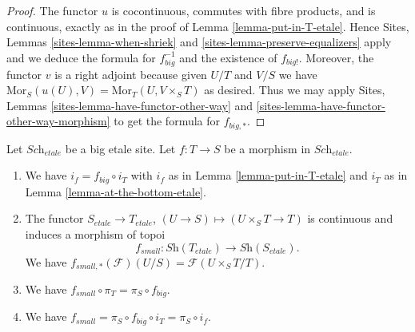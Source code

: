 \begin{proof}
The functor $u$ is cocontinuous, commutes with fibre products,
and is continuous, exactly as in the proof of Lemma \ref{lemma-put-in-T-etale}.
Hence Sites, Lemmas \ref{sites-lemma-when-shriek}
and \ref{sites-lemma-preserve-equalizers}
apply and we deduce the formula
for $f_{big}^{-1}$ and the existence of $f_{big!}$. Moreover,
the functor $v$ is a right adjoint because given $U/T$ and $V/S$
we have $\text{Mor}_S(u(U), V) = \text{Mor}_T(U, V\times_S T)$
as desired. Thus we may apply
Sites, Lemmas \ref{sites-lemma-have-functor-other-way} and
\ref{sites-lemma-have-functor-other-way-morphism} to get the
formula for $f_{big, *}$.
\end{proof}

\begin{lemma}
\label{lemma-morphism-big-small-etale}
Let $\textit{Sch}_{etale}$ be a big etale site.
Let $f : T \to S$ be a morphism in $\textit{Sch}_{etale}$.
\begin{enumerate}
\item We have $i_f = f_{big} \circ i_T$ with $i_f$ as in
Lemma \ref{lemma-put-in-T-etale} and $i_T$ as in
Lemma \ref{lemma-at-the-bottom-etale}.
\item The functor $S_{etale} \to T_{etale}$,
$(U \to S) \mapsto (U \times_S T \to T)$ is continuous and induces
a morphism of topoi
$$
f_{small} :
\textit{Sh}(T_{etale})
\longrightarrow
\textit{Sh}(S_{etale}).
$$
We have $f_{small, *}(\mathcal{F})(U/S) = \mathcal{F}(U\times_S T/T)$.
\item We have $f_{small} \circ \pi_T = \pi_S \circ f_{big}$.
\item We have $f_{small} = \pi_S \circ f_{big} \circ i_T = \pi_S \circ i_f$.
\end{enumerate}
\end{lemma}

